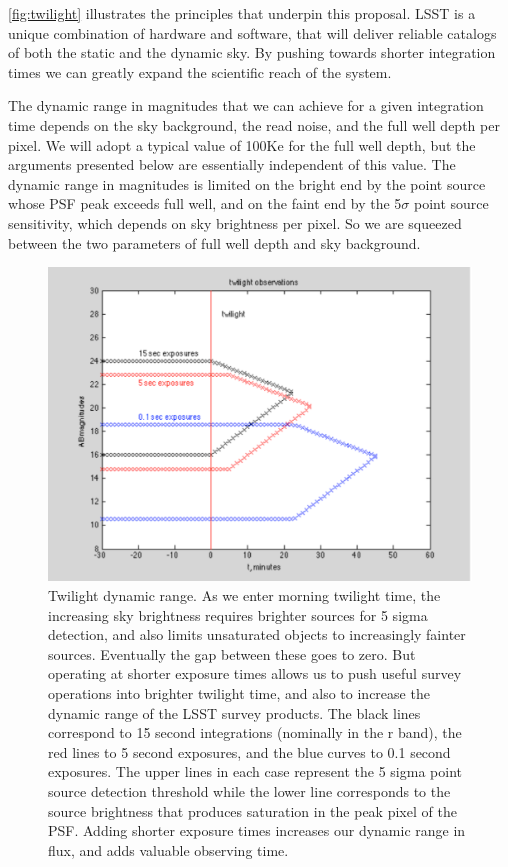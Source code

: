 \autoref{fig:twilight} illustrates the principles that underpin this proposal. LSST is
a unique combination of hardware and software, that will deliver
reliable catalogs of both the static and the dynamic sky. By pushing
towards shorter integration times we can greatly expand the scientific
reach of the system.

The dynamic range in magnitudes that we can achieve for a given
integration time depends on the sky background, the read noise, and the
full well depth per pixel. We will adopt a typical value of 100Ke for
the full well depth, but the arguments presented below are essentially
independent of this value. The dynamic range in magnitudes is limited on
the bright end by the point source whose PSF peak exceeds full well, and
on the faint end by the 5$\sigma$ point source sensitivity, which
depends on sky brightness per pixel. So we are squeezed between the two
parameters of full well depth and sky background.

\begin{figure}[htbp]
\begin{center}
\includegraphics[width=6in]{figs/Stubbs_Fig2.pdf}
\caption{Twilight dynamic range. As we enter morning twilight time, the increasing sky brightness requires brighter sources for 5 sigma detection, and also limits unsaturated objects to increasingly fainter sources. Eventually the gap between these goes to zero. But operating at shorter exposure times allows us to push useful survey operations into brighter twilight time, and also to increase the dynamic range of the LSST survey products. The black lines correspond to 15 second integrations (nominally in the r band), the red lines to 5 second exposures, and the blue curves to 0.1 second exposures. The upper lines in each case represent the 5 sigma point source detection threshold while the lower line corresponds to the source brightness that produces saturation in the peak pixel of the PSF. Adding shorter exposure times increases our dynamic range in flux, and adds valuable observing time.}
\label{fig:twilight}
\end{center}
\end{figure}


